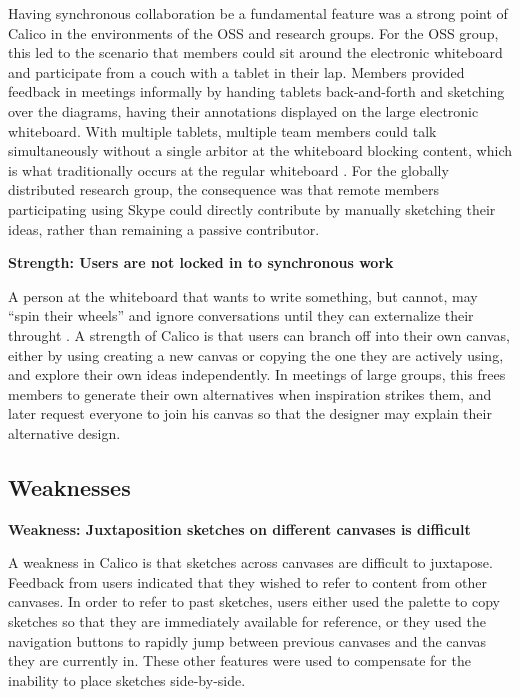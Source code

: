 Having synchronous collaboration be a fundamental feature was a strong point of Calico in the environments of the OSS and research groups. For the OSS group, this led to the scenario that members could sit around the electronic whiteboard and participate from a couch with a tablet in their lap. Members provided feedback in meetings informally by handing tablets back-and-forth and sketching over the diagrams, having their annotations displayed on the large electronic whiteboard. With multiple tablets, multiple team members could talk simultaneously without a single arbitor at the whiteboard blocking content, which is what traditionally occurs at the regular whiteboard \cite{Shih2009}. For the globally distributed research group, the consequence was that remote members participating using Skype could directly contribute by manually sketching their ideas, rather than remaining a passive contributor.

\textbf{Strength: Users are not locked in to synchronous work}

A person at the whiteboard that wants to write something, but cannot, may ``spin their wheels'' and ignore conversations until they can externalize their throught \cite{Olsonb}. A strength of Calico is that users can branch off into their own canvas, either by using creating a new canvas or copying the one they are actively using, and explore their own ideas independently. In meetings of large groups, this frees members to generate their own alternatives when inspiration strikes them, and later request everyone to join his canvas so that the designer may explain their alternative design.


\subsection{Weaknesses}

\textbf{Weakness: Juxtaposition sketches on different canvases is difficult}

A weakness in Calico is that sketches across canvases are difficult to juxtapose. Feedback from users indicated that they wished to refer to content from other canvases. In order to refer to past sketches, users either used the palette to copy sketches so that they are immediately available for reference, or they used the navigation buttons to rapidly jump between previous canvases and the canvas they are currently in. These other features were used to compensate for the inability to place sketches side-by-side.

